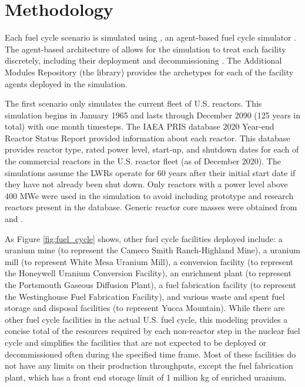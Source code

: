 \section{Methodology}

Each fuel cycle scenario is simulated using \Cyclus, an 
agent-based fuel cycle simulator \cite{huff_fundamental_2016}. 
The agent-based architecture of \Cyclus allows for the simulation to treat
each facility discretely, including their deployment and 
decommissioning \cite{huff_fundamental_2016}. The \Cyclus 
Additional Modules Repository (the \Cycamore library) provides 
the archetypes for each of the facility agents deployed in the simulation.

The first scenario only simulates the current fleet of U.S. reactors. This 
simulation begins in January 1965 and lasts through December 2090 (125 
years in total) with one month timesteps. The \gls{IAEA} \gls{PRIS} 
database \cite{noauthor_power_1989} 2020 
Year-end Reactor Status Report provided information about each reactor.
This database provides reactor type, rated power level, start-up, and 
shutdown dates for each of the commercial reactors in the U.S. reactor 
fleet (as of December 2020). The simulations assume 
the \gls{LWR}s operate for 60 years after their
initial start date if they have not already been shut down. Only reactors
with a power level above 400 MWe were 
used in the simulation to avoid including prototype and research reactors 
present in the database. Generic reactor core masses were obtained from 
\cite{todreas_nuclear_2012} and \cite{cacuci_handbook_2010}. 

As Figure \ref{fig:fuel_cycle} shows, other fuel cycle facilities deployed 
include: a uranium mine (to 
represent the Cameco Smith Ranch-Highland Mine), a uranium mill (to 
represent White Mesa Uranium Mill), a conversion facility (to represent 
the Honeywell Uranium Conversion Facility), an enrichment plant (to represent 
the Portsmouth Gaseous Diffusion Plant), a fuel fabrication facility (to 
represent the Westinghouse Fuel Fabrication Facility), and various waste and 
spent fuel storage and disposal facilities (to represent Yucca Mountain). 
While there
are other fuel cycle facilities in the actual U.S. fuel cycle, this 
modeling provides a concise total of the resources required 
by each non-reactor step in the nuclear fuel cycle and simplifies the 
facilities that are not expected to be deployed or decommissioned often 
during the specified time frame. Most of these facilities do not have 
any limits on their production throughputs, except the fuel fabrication 
plant, which has a front end storage limit of 1 million kg of enriched 
uranium. 

